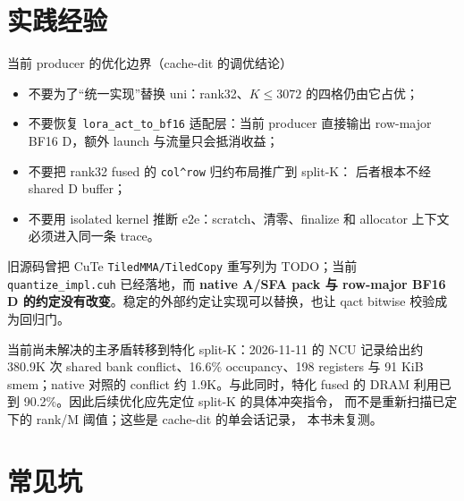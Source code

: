 \section{实践经验}

\begin{kaogu}[F4]{当前 producer 的优化边界（cache-dit 的调优结论）}
\begin{itemize}[itemsep=0.5pt,topsep=1pt]
  \item 不要为了“统一实现”替换 uni：rank32、$K\le3072$ 的四格仍由它占优；
  \item 不要恢复 \texttt{lora\_act\_to\_bf16} 适配层：当前 producer 直接输出
        row-major BF16 D，额外 launch 与流量只会抵消收益；
  \item 不要把 rank32 fused 的 \texttt{col\^{}row} 归约布局推广到 split-K：
        后者根本不经 shared D buffer；
  \item 不要用 isolated kernel 推断 e2e：scratch、清零、finalize 和 allocator
        上下文必须进入同一条 trace。
\end{itemize}
\end{kaogu}

旧源码曾把 CuTe \texttt{TiledMMA/TiledCopy} 重写列为 TODO；当前
\texttt{quantize\_impl.cuh} 已经落地，而 \textbf{native A/SFA pack 与
row-major BF16 D 的约定没有改变}。稳定的外部约定让实现可以替换，也让
qact bitwise 校验成为回归门。

当前尚未解决的主矛盾转移到特化 split-K：2026-11-11 的 NCU 记录给出约
380.9K 次 shared bank conflict、16.6\% occupancy、198 registers 与
91 KiB smem；native 对照的 conflict 约 1.9K。与此同时，特化 fused 的
DRAM 利用已到 90.2\%。因此后续优化应先定位 split-K 的具体冲突指令，
而不是重新扫描已定下的 rank/M 阈值；这些是 cache-dit 的单会话记录，
本书未复测。

\section{常见坑}

